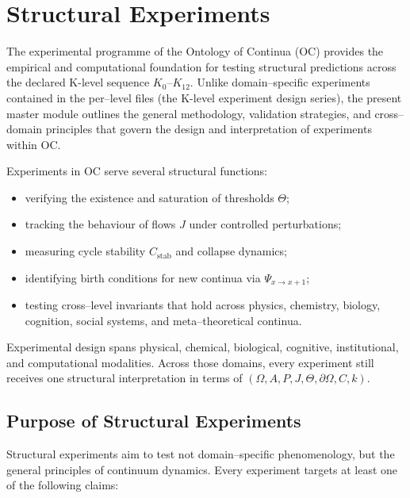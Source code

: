 
\section{Structural Experiments}
\label{sec:experiments-master}

The experimental programme of the Ontology of Continua (OC) provides the
empirical and computational foundation for testing structural predictions
across the declared K-level sequence $K_0$–$K_{12}$.  
Unlike domain–specific experiments contained in the per–level files
(the K-level experiment design series), the present master module outlines the
general methodology, validation strategies, and cross–domain principles
that govern the design and interpretation of experiments within OC.

Experiments in OC serve several structural functions:
\begin{itemize}
    \item verifying the existence and saturation of thresholds $\Theta$;
    \item tracking the behaviour of flows $J$ under controlled perturbations;
    \item measuring cycle stability $C_{\mathrm{stab}}$ and collapse dynamics;
    \item identifying birth conditions for new continua via $\Psi_{x\to x+1}$;
    \item testing cross–level invariants that hold across physics, chemistry,
          biology, cognition, social systems, and meta–theoretical continua.
\end{itemize}

Experimental design spans physical, chemical, biological, cognitive,
institutional, and computational modalities. Across those domains, every
experiment still receives one structural interpretation in terms of
$(\Omega, A, P, J, \Theta, \partial\Omega, C, k)$.


\subsection{Purpose of Structural Experiments}

Structural experiments aim to test not domain–specific phenomenology, but the
general principles of continuum dynamics.  
Every experiment targets at least one of the following claims:

